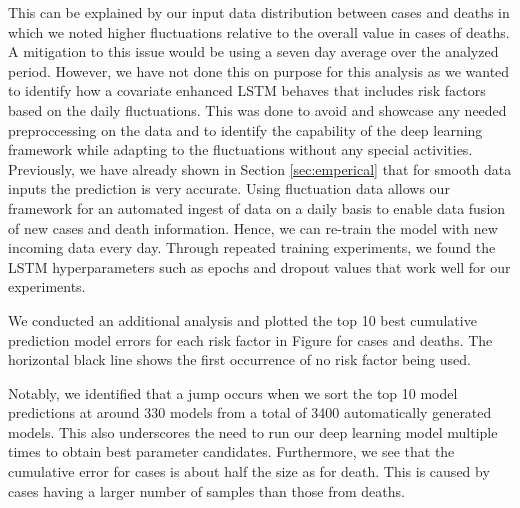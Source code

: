 \documentclass[a4paper, inpress]{jds} %
\renewcommand{\_}{%
    \textunderscore\hspace{0pt}%
}
\begin{document}
This can be explained by our input data distribution between cases and deaths in which we noted higher
fluctuations relative to the overall value in cases of deaths. 
A mitigation to this issue
would be using a seven day average over the analyzed period. However,
we have not done this on purpose for this analysis as we wanted to
identify how a covariate enhanced LSTM behaves that includes risk
factors based on the daily fluctuations. This was done to avoid and
showcase any needed preproccessing on the data and to identify the
capability of the deep learning framework while adapting to the
fluctuations without any special activities. Previously, we have
already shown in Section \ref{sec:emperical} that for smooth data
inputs the prediction is very accurate.  Using fluctuation data allows
our framework for an automated ingest of data on a daily basis to
enable data fusion of new cases and death information. Hence, we can
re-train the model with new incoming data every day. Through repeated
training experiments, we found the LSTM hyperparameters such as epochs
and dropout values that work well for our experiments.

We conducted an additional analysis and plotted the top 10 best
cumulative prediction model errors for each risk factor in
Figure \label{fig:place-top10} for cases and deaths.  The horizontal
black line shows the first occurrence of no risk factor being used.

Notably, we identified that a jump occurs when we sort the top 10
model predictions at around 330 models from a total of 3400
automatically generated models. This also underscores the need to run
our deep learning model multiple times to obtain best parameter
candidates.  Furthermore, we see that the cumulative error for cases
is about half the size as for death. This is caused by cases having a
larger number of samples than those from deaths.

\end{document}
